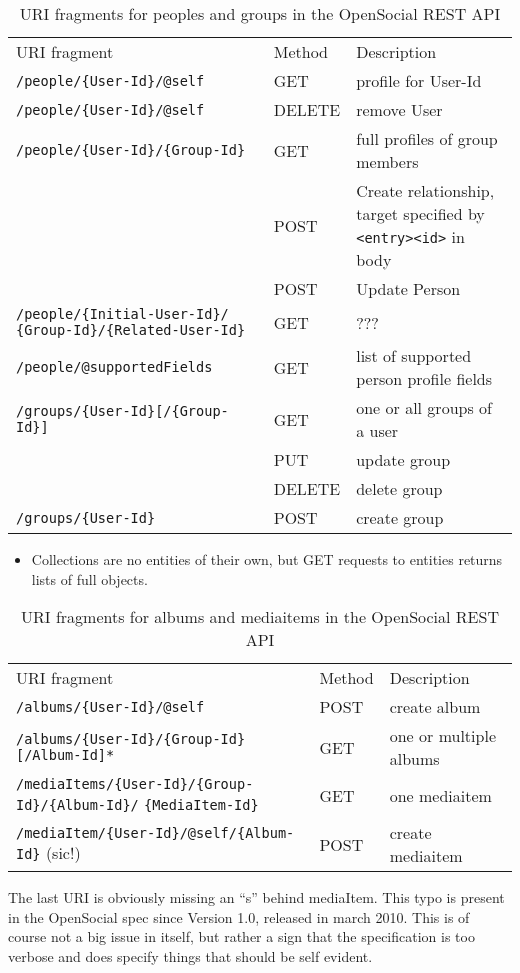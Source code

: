 \documentclass[12pt,a4paper]{scrartcl}		%
\begin{document}
\begin{table}[h]
\begin{tabular}{p{6.5cm} l p{10cm}}
  URI fragment & Method & Description \\
  \verb:/people/{User-Id}/@self: & GET & profile for User-Id \\
  \verb:/people/{User-Id}/@self: & DELETE & remove User \\
  \verb:/people/{User-Id}/{Group-Id}: & GET & full profiles of group members \\
  \verb:: & POST & Create relationship, target specified \newline by \verb:<entry><id>: in body \\
   & POST & Update Person \\
  \verb:/people/{Initial-User-Id}/: \newline \verb:{Group-Id}/{Related-User-Id}: & GET & ??? \\
  \verb:/people/@supportedFields: & GET & list of supported person profile fields \\
  \verb:/groups/{User-Id}[/{Group-Id}]: & GET & one or all groups of a user \\
   & PUT & update group \\
   & DELETE & delete group \\
  \verb:/groups/{User-Id}: & POST & create group \\
\end{tabular}
  \caption{URI fragments for peoples and groups in the OpenSocial REST API}
\end{table}

\begin{itemize}
  \item Collections are no entities of their own, but GET requests to entities returns lists of full objects.
\end{itemize}

\begin{table}[h]
\begin{tabular}{p{9.5cm} l p{8cm}}
  URI fragment & Method & Description \\
  \verb:/albums/{User-Id}/@self: & POST & create album \\
  \verb:/albums/{User-Id}/{Group-Id}[/Album-Id]*: & GET & one or multiple albums \\
  \verb:/mediaItems/{User-Id}/{Group-Id}/{Album-Id}/: \newline \verb:{MediaItem-Id}: & GET & one mediaitem \\
  \verb:/mediaItem/{User-Id}/@self/{Album-Id}: (sic!) & POST & create mediaitem \\
\end{tabular}
  \caption{URI fragments for albums and mediaitems in the OpenSocial REST API}  
\end{table}
    The last URI is obviously missing an ``s'' behind mediaItem. This typo is present in the OpenSocial 
              spec since Version 1.0, released in march 2010. This is of course not a big issue in itself,
              but rather a sign that the specification is too verbose and does specify things that should be
              self evident.
\end{document}
